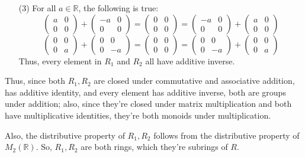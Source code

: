 \documentclass{article}
\begin{document}
\begin{itemize}
    \hfill
    
    \item[(3)] For all $a\in\mathbb{R}$, the following is true:
    $$\begin{pmatrix}
        a&0\\0&0
    \end{pmatrix}+\begin{pmatrix}
        -a&0\\0&0
    \end{pmatrix}=\begin{pmatrix}
        0&0\\0&0
    \end{pmatrix}=\begin{pmatrix}
        -a&0\\0&0
    \end{pmatrix}+\begin{pmatrix}
        a&0\\0&0
    \end{pmatrix}$$
    $$ \begin{pmatrix}
        0&0\\0&a
    \end{pmatrix}+\begin{pmatrix}
        0&0\\0&-a
    \end{pmatrix}=\begin{pmatrix}
        0&0\\0&0
    \end{pmatrix}=\begin{pmatrix}
        0&0\\0&-a
    \end{pmatrix}+\begin{pmatrix}
        0&0\\0&a
    \end{pmatrix}$$
    Thus, every element in $R_1$ and $R_2$ all have additive inverse.
\end{itemize}

Thus, since both $R_1,R_2$ are closed under commutative and associative addition, has additive identity, and every element has additive inverse,
both are groups under addition; also, since they're closed under matrix multiplication and both have multiplicative identities, they're both monoids under multiplication.

Also, the distributive property of $R_1, R_2$ follows from the distributive property of $M_2(\mathbb{R})$. So, $R_1,R_2$ are both rings, which they're subrings of $R$.
\end{document}
